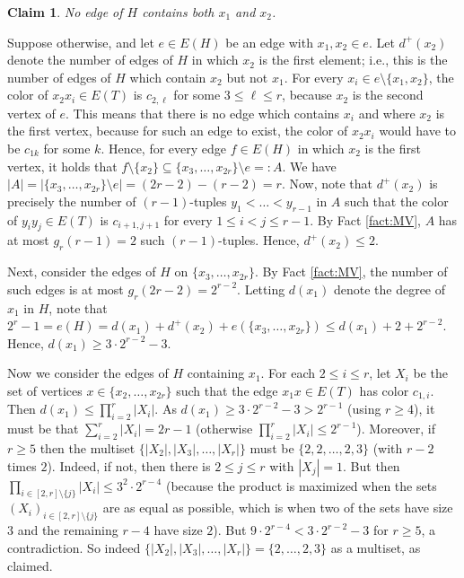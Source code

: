 \documentclass[11pt]{article}
\let\oldendproof\endproof
\renewenvironment{proof}[1][\proofname]{%
	\oldproof[\bf #1]%
}{\oldendproof}
\theoremstyle{plain}
\newtheorem{claim}[theorem]{Claim}
\begin{document}
	\begin{claim}\label{claim:x1,x2}
		No edge of $H$ contains both $x_1$ and $x_2$.
	\end{claim}
	\begin{proof}
		Suppose otherwise, and let $e \in E(H)$ be an edge with $x_1,x_2 \in e$. Let $d^+(x_2)$ denote the number of edges of $H$ in which $x_2$ is the first element; i.e., this is the number of edges of $H$ which contain $x_2$ but not $x_1$. For every $x_i \in e \setminus \{x_1,x_2\}$, the color of $x_2x_i \in E(T)$ is $c_{2,\ell}$ for some $3 \leq \ell \leq r$, because $x_2$ is the second vertex of $e$. This means that there is no edge which contains $x_i$ and where $x_2$ is the first vertex, because for such an edge to exist, the color of $x_2x_i$ would have to be $c_{1k}$ for some $k$. Hence, for every edge $f \in E(H)$ in which $x_2$ is the first vertex, it holds that $f \setminus \{x_2\} \subseteq \{x_3,\dots,x_{2r}\} \setminus e =: A$. We have $|A| = |\{x_3,\dots,x_{2r}\} \setminus e| = (2r-2) - (r-2) = r$. Now, note that $d^+(x_2)$ is precisely the number of $(r-1)$-tuples $y_1 < \dots < y_{r-1}$ in $A$ such that the color of $y_iy_j \in E(T)$ is $c_{i+1,j+1}$ for every $1 \leq i < j \leq r-1$. By Fact \ref{fact:MV}, $A$ has at most $g_r(r-1) = 2$ such $(r-1)$-tuples. Hence, $d^+(x_2) \leq 2$. 
		
		Next, consider the edges of $H$ on $\{x_3,\dots,x_{2r}\}$. By Fact \ref{fact:MV}, the number of such edges is at most $g_r(2r-2) = 2^{r-2}$. Letting $d(x_1)$ denote the degree of $x_1$ in $H$, note that 
		$2^r-1 = e(H) = d(x_1) + d^+(x_2) + e(\{x_3,\dots,x_{2r}\}) \leq d(x_1) + 2 + 2^{r-2}$. Hence, $d(x_1) \geq 3 \cdot 2^{r-2} - 3$. 
		
		Now we consider the edges of $H$ containing $x_1$. For each $2 \leq i \leq r$, let $X_i$ be the set of vertices $x \in \{x_2,\dots,x_{2r}\}$ such that the edge $x_1x \in E(T)$ has color $c_{1,i}$. Then $d(x_1) \leq \prod_{i=2}^r |X_i|$. As $d(x_1) \geq 3 \cdot 2^{r-2} - 3 > 2^{r-1}$ (using $r \geq 4$), it must be that $\sum_{i=2}^r |X_i| = 2r-1$ (otherwise $\prod_{i=2}^r |X_i| \leq 2^{r-1}$). Moreover, if $r \geq 5$ then the multiset $\{|X_2|,|X_3|,\dots,|X_r|\}$ must be $\{2,2,\dots,2,3\}$ (with $r-2$ times $2$). Indeed, if not, then there is $2 \leq j \leq r$ with $|X_j|=1$. But then $\prod_{i \in [2,r] \setminus \{j\}}|X_i| \leq 3^2 \cdot 2^{r-4}$ (because the product is maximized when the sets $(X_i)_{i \in [2,r] \setminus \{j\}}$ are as equal as possible, which is when two of the sets have size $3$ and the remaining $r-4$ have size $2$). But $9 \cdot 2^{r-4} < 3 \cdot 2^{r-2} - 3$ for $r \geq 5$, a contradiction. 
		So indeed $\{|X_2|,|X_3|,\dots,|X_r|\} = \{2,\dots,2,3\}$ as a multiset, as claimed. 
        

\end{proof}
\end{document}
